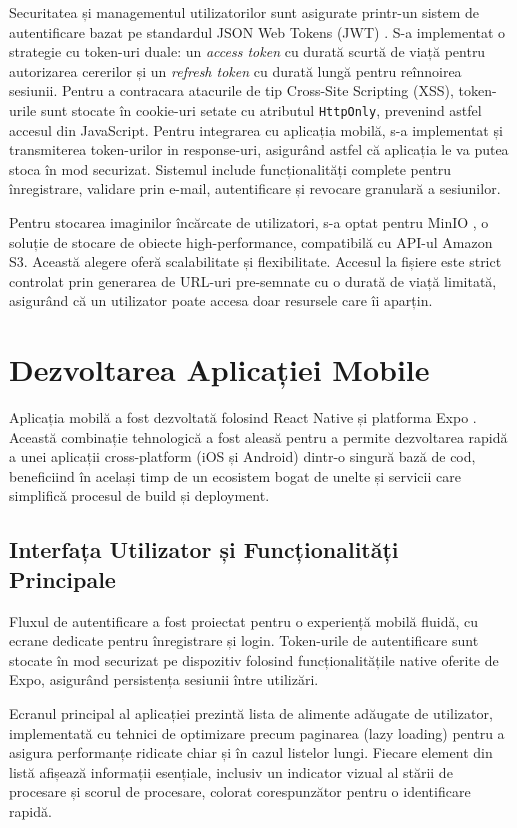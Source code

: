 Securitatea și managementul utilizatorilor sunt asigurate printr-un sistem de autentificare bazat pe standardul JSON Web Tokens (JWT) \cite{JWT}. S-a implementat o strategie cu token-uri duale: un \textit{access token} cu durată scurtă de viață pentru autorizarea cererilor și un \textit{refresh token} cu durată lungă pentru reînnoirea sesiunii. Pentru a contracara atacurile de tip Cross-Site Scripting (XSS), token-urile sunt stocate în cookie-uri setate cu atributul \texttt{HttpOnly}, prevenind astfel accesul din JavaScript. Pentru integrarea cu aplicația mobilă, s-a implementat și transmiterea token-urilor in response-uri, asigurând astfel că aplicația le va putea stoca în mod securizat. Sistemul include funcționalități complete pentru înregistrare, validare prin e-mail, autentificare și revocare granulară a sesiunilor.

Pentru stocarea imaginilor încărcate de utilizatori, s-a optat pentru MinIO \cite{MinIO}, o soluție de stocare de obiecte high-performance, compatibilă cu API-ul Amazon S3. Această alegere oferă scalabilitate și flexibilitate. Accesul la fișiere este strict controlat prin generarea de URL-uri pre-semnate cu o durată de viață limitată, asigurând că un utilizator poate accesa doar resursele care îi aparțin.

\section{Dezvoltarea Aplicației Mobile}

Aplicația mobilă a fost dezvoltată folosind React Native \cite{ReactNative} și platforma Expo \cite{Expo}. Această combinație tehnologică a fost aleasă pentru a permite dezvoltarea rapidă a unei aplicații cross-platform (iOS și Android) dintr-o singură bază de cod, beneficiind în același timp de un ecosistem bogat de unelte și servicii care simplifică procesul de build și deployment.

\subsection{Interfața Utilizator și Funcționalități Principale}

Fluxul de autentificare a fost proiectat pentru o experiență mobilă fluidă, cu ecrane dedicate pentru înregistrare și login. Token-urile de autentificare sunt stocate în mod securizat pe dispozitiv folosind funcționalitățile native oferite de Expo, asigurând persistența sesiunii între utilizări.

Ecranul principal al aplicației prezintă lista de alimente adăugate de utilizator, implementată cu tehnici de optimizare precum paginarea (lazy loading) pentru a asigura performanțe ridicate chiar și în cazul listelor lungi. Fiecare element din listă afișează informații esențiale, inclusiv un indicator vizual al stării de procesare și scorul de procesare, colorat corespunzător pentru o identificare rapidă.

